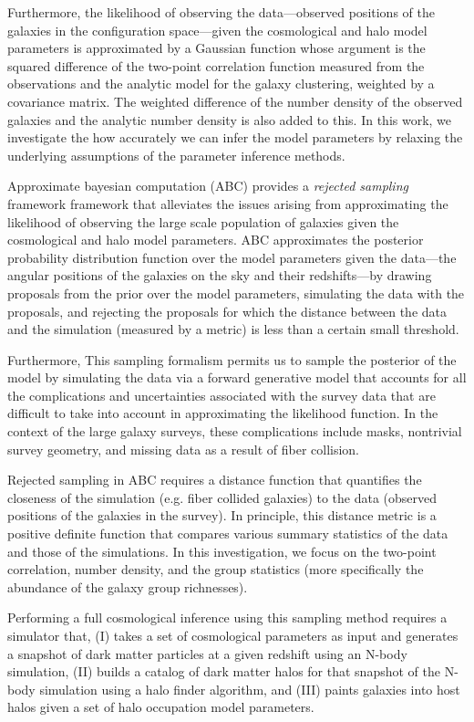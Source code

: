 \documentclass[12pt, preprint]{aastex}
\begin{document}
Furthermore, the likelihood of observing the data---observed positions of the galaxies in the configuration space---given the cosmological and halo model parameters is approximated by a Gaussian function whose argument is the squared difference of the two-point correlation function measured from the observations and the analytic model for the galaxy clustering, weighted by a covariance matrix. The weighted difference of the number density of the observed galaxies and the analytic number density is also added to this. In this work, we investigate the how accurately we can infer the model parameters by relaxing the underlying assumptions of the parameter inference methods. 

Approximate bayesian computation (ABC) provides a \emph{rejected sampling} framework framework that alleviates the issues arising from approximating the likelihood of observing the large scale population of galaxies given the cosmological and halo model parameters. ABC approximates the posterior probability distribution function over the model parameters given the data---the angular positions of the galaxies on the sky and their redshifts---by drawing proposals from the prior over the model parameters, simulating the data with the proposals, and rejecting the proposals for which the distance between the data and the simulation (measured by a metric) is less than a certain small threshold. 

Furthermore, This sampling formalism permits us to sample the posterior of the model by simulating the data via a forward generative model that accounts for all the complications and uncertainties associated with the survey data that are difficult to take into account in approximating the likelihood function. In the context of the large galaxy surveys, these complications include masks, nontrivial survey geometry, and missing data as a result of fiber collision.

Rejected sampling in ABC requires a distance function that quantifies the closeness of the simulation (e.g. fiber collided galaxies) to the data (observed positions of the galaxies in the survey). In principle, this distance metric is a positive definite function  that compares various summary statistics of the data and those of the simulations. In this investigation, we focus on the two-point correlation, number density, and the group statistics (more specifically the abundance of the galaxy group richnesses). 

Performing a full cosmological inference using this sampling method requires a simulator that, (I) takes a set of cosmological parameters as input and generates a snapshot of dark matter particles at a given redshift using an N-body simulation, (II) builds a catalog of dark matter halos for that snapshot of the N-body simulation using a halo finder algorithm, and (III) paints galaxies into host halos given a set of halo occupation model parameters. 
\end{document}
